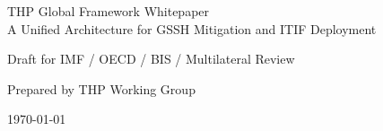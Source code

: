 \begin{center}
  {\LARGE THP Global Framework Whitepaper\\[6pt]
  \large A Unified Architecture for GSSH Mitigation and ITIF Deployment}

  \vspace{1.5cm}
  {\large Draft for IMF / OECD / BIS / Multilateral Review}\par
  {\large Prepared by THP Working Group}\par
  {\large \today}
\end{center}

\newpage
